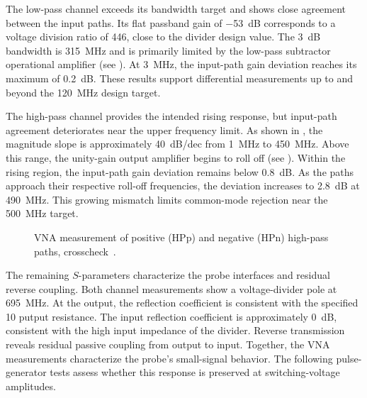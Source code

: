 The low-pass channel exceeds its bandwidth target and shows close agreement between the input paths.
Its flat passband gain of \SI{-53}{dB} corresponds to a voltage division ratio of 446, close to the divider design value.
The \SI{3}{dB} bandwidth is \SI{315}{MHz} and is primarily limited by the low-pass subtractor operational amplifier (see ).
At \SI{3}{MHz}, the input-path gain deviation reaches its maximum of \SI{0.2}{dB}.
These results support differential measurements up to and beyond the \SI{120}{MHz} design target.

The high-pass channel provides the intended rising response, but input-path agreement deteriorates near the upper frequency limit.
As shown in , the magnitude slope is approximately \SI{+40}{dB/dec} from \SI{1}{MHz} to \SI{450}{MHz}.
Above this range, the unity-gain output amplifier begins to roll off (see ).
Within the rising region, the input-path gain deviation remains below \SI{0.8}{dB}.
As the paths approach their respective roll-off frequencies, the deviation increases to \SI{2.8}{dB} at \SI{490}{MHz}.
This growing mismatch limits common-mode rejection near the \SI{500}{MHz} target.

\begin{figure}[ht]
	\centering
	
	\caption{VNA measurement of positive (HPp) and negative (HPn) high-pass paths, crosscheck~.}\label{fig:VNA_HP}
\end{figure}

The remaining $S$-parameters characterize the probe interfaces and residual reverse coupling.
Both channel measurements show a voltage-divider pole at \SI{695}{MHz}.
At the output, the reflection coefficient  is consistent with the specified \SI{10}{\Omega} putput resistance.
The input reflection coefficient  is approximately \SI{0}{dB}, consistent with the high input impedance of the divider.
Reverse transmission  reveals residual passive coupling from output to input.
Together, the VNA measurements characterize the probe's small-signal behavior.
The following pulse-generator tests assess whether this response is preserved at switching-voltage amplitudes.













